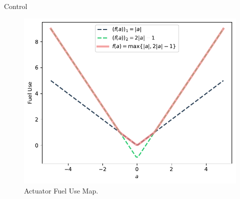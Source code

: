 \begin{chapter}{Control}
    \begin{figure}[h]
        \centering
        \includegraphics[width=\linewidth]{examples/364a/cvx-ch4/actuator_fuel-use.pdf}
        \caption{Actuator Fuel Use Map.}
        \label{fig:fuel-map}
    \end{figure}


\end{chapter}
